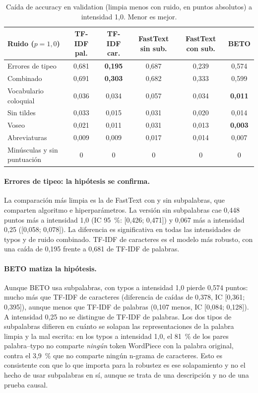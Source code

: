 \documentclass[11pt,a4paper]{article}
\begin{document}
\begin{table}[H]
\centering
\small
\begin{tabular}{@{}l c c c c c@{}}
\toprule
Ruido ($p=1{,}0$) & TF-IDF pal. & TF-IDF car. & FastText sin sub. & FastText con sub. & BETO \\
\midrule
Errores de tipeo & 0,681 & \textbf{0,195} & 0,687 & 0,239 & 0,574 \\
Combinado & 0,691 & \textbf{0,303} & 0,682 & 0,333 & 0,599 \\
Vocabulario coloquial & 0,036 & 0,034 & 0,057 & 0,034 & \textbf{0,011} \\
Sin tildes & 0,033 & 0,015 & 0,031 & 0,020 & 0,014 \\
Voseo & 0,021 & 0,011 & 0,031 & 0,013 & \textbf{0,003} \\
Abreviaturas & 0,009 & 0,009 & 0,017 & 0,014 & 0,007 \\
Minúsculas y sin puntuación & 0 & 0 & 0 & 0 & 0 \\
\bottomrule
\end{tabular}
\caption{Caída de accuracy en validation (limpia menos con ruido, en puntos absolutos) a
intensidad 1,0. Menor es mejor.}
\label{tab:caidas}
\end{table}

\paragraph{Errores de tipeo: la hipótesis se confirma.} La comparación más limpia es la de
FastText con y sin subpalabras, que comparten algoritmo e hiperparámetros. La versión sin
subpalabras cae 0,448 puntos más a intensidad 1,0 (IC 95~\%: [0,426; 0,471]) y 0,067 más a
intensidad 0,25 ([0,058; 0,078]). La diferencia es significativa en todas las intensidades de
typos y de ruido combinado. TF-IDF de caracteres es el modelo más robusto, con una caída de
0,195 frente a 0,681 de TF-IDF de palabras.

\paragraph{BETO matiza la hipótesis.} Aunque BETO usa subpalabras, con typos a intensidad 1,0
pierde 0,574 puntos: mucho más que TF-IDF de caracteres (diferencia de caídas de 0,378, IC
[0,361; 0,395]), aunque menos que TF-IDF de palabras (0,107 menos, IC [0,084; 0,128]). A
intensidad 0,25 no se distingue de TF-IDF de palabras. Los dos tipos de subpalabras difieren en
cuánto se solapan las representaciones de la palabra limpia y la mal escrita: en los typos a
intensidad 1,0, el 81~\% de los pares palabra--typo no comparte \emph{ningún} token WordPiece
con la palabra original, contra el 3,9~\% que no comparte ningún n-grama de caracteres. Esto es
consistente con que lo que importa para la robustez es ese solapamiento y no el hecho de usar
subpalabras en sí, aunque se trata de una descripción y no de una prueba causal.
\end{document}
